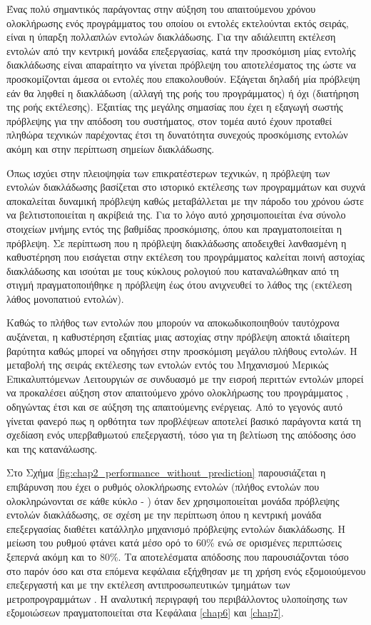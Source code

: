 Ένας πολύ σημαντικός παράγοντας στην αύξηση του απαιτούμενου χρόνου ολοκλήρωσης ενός προγράμματος του οποίου οι εντολές εκτελούνται εκτός σειράς, είναι η ύπαρξη πολλαπλών εντολών διακλάδωσης. Για την αδιάλειπτη εκτέλεση εντολών από την κεντρική μονάδα επεξεργασίας, κατά την προσκόμιση μίας εντολής διακλάδωσης είναι απαραίτητο να γίνεται πρόβλεψη του αποτελέσματος της ώστε να προσκομίζονται άμεσα οι εντολές που επακολουθούν. Εξάγεται δηλαδή μία πρόβλεψη εάν θα ληφθεί η διακλάδωση (αλλαγή της ροής του προγράμματος) ή όχι (διατήρηση της ροής εκτέλεσης). Εξαιτίας της μεγάλης σημασίας που έχει η εξαγωγή σωστής πρόβλεψης για την απόδοση του συστήματος, στον τομέα αυτό έχουν προταθεί πληθώρα τεχνικών παρέχοντας έτσι τη δυνατότητα συνεχούς προσκόμισης εντολών ακόμη και στην περίπτωση σημείων διακλάδωσης.
\par
Όπως ισχύει στην πλειοψηφία των επικρατέστερων τεχνικών, η πρόβλεψη των εντολών διακλάδωσης βασίζεται στο ιστορικό εκτέλεσης των προγραμμάτων και συχνά αποκαλείται δυναμική πρόβλεψη καθώς μεταβάλλεται με την πάροδο του χρόνου ώστε να βελτιστοποιείται η ακρίβειά της. Για το λόγο αυτό χρησιμοποιείται ένα σύνολο στοιχείων μνήμης εντός της βαθμίδας προσκόμισης, όπου και πραγματοποιείται η πρόβλεψη. Σε περίπτωση που η πρόβλεψη διακλάδωσης αποδειχθεί λανθασμένη η καθυστέρηση που εισάγεται στην εκτέλεση του προγράμματος καλείται ποινή αστοχίας διακλάδωσης και ισούται με τους κύκλους ρολογιού που καταναλώθηκαν από τη στιγμή πραγματοποιήθηκε η πρόβλεψη έως ότου ανιχνευθεί το λάθος της (εκτέλεση λάθος μονοπατιού εντολών).
\par
Καθώς το πλήθος των εντολών που μπορούν να αποκωδικοποιηθούν ταυτόχρονα αυξάνεται, η καθυστέρηση εξαιτίας μιας αστοχίας στην πρόβλεψη αποκτά ιδιαίτερη βαρύτητα καθώς μπορεί να οδηγήσει στην προσκόμιση μεγάλου πλήθους εντολών. Η μεταβολή της σειράς εκτέλεσης των εντολών εντός του Μηχανισμού Μερικώς Επικαλυπτόμενων Λειτουργιών σε συνδυασμό με την εισροή περιττών εντολών μπορεί να προκαλέσει αύξηση στον απαιτούμενο χρόνο ολοκλήρωσης του προγράμματος \cite{sendag2002effect}, οδηγώντας έτσι και σε αύξηση της απαιτούμενης ενέργειας. Από το γεγονός αυτό γίνεται φανερό πως η ορθότητα των προβλέψεων αποτελεί βασικό παράγοντα κατά τη σχεδίαση ενός υπερβαθμωτού επεξεργαστή, τόσο για τη βελτίωση της απόδοσης όσο και της κατανάλωσης.
\par
Στο Σχήμα \ref{fig:chap2_performance_without_prediction} παρουσιάζεται η επιβάρυνση που έχει ο ρυθμός ολοκλήρωσης εντολών (πλήθος εντολών που ολοκληρώνονται σε κάθε κύκλο - \ipc) όταν δεν χρησιμοποιείται μονάδα πρόβλεψης εντολών διακλάδωσης, σε σχέση με την περίπτωση όπου η κεντρική μονάδα επεξεργασίας διαθέτει κατάλληλο μηχανισμό πρόβλεψης εντολών διακλάδωσης. Η μείωση του ρυθμού φτάνει κατά μέσο ορό το 60\% ενώ σε ορισμένες περιπτώσεις ξεπερνά ακόμη και το 80\%. Τα αποτελέσματα απόδοσης που παρουσιάζονται τόσο στο παρόν όσο και στα επόμενα κεφάλαια εξήχθησαν με τη χρήση ενός εξομοιούμενου  επεξεργαστή και με την εκτέλεση αντιπροσωπευτικών τμημάτων των μετροπρογραμμάτων \spec \cite{bird2007performance}. Η αναλυτική περιγραφή του περιβάλλοντος υλοποίησης των εξομοιώσεων πραγματοποιείται στα Κεφάλαια \ref{chap6} και \ref{chap7}.

